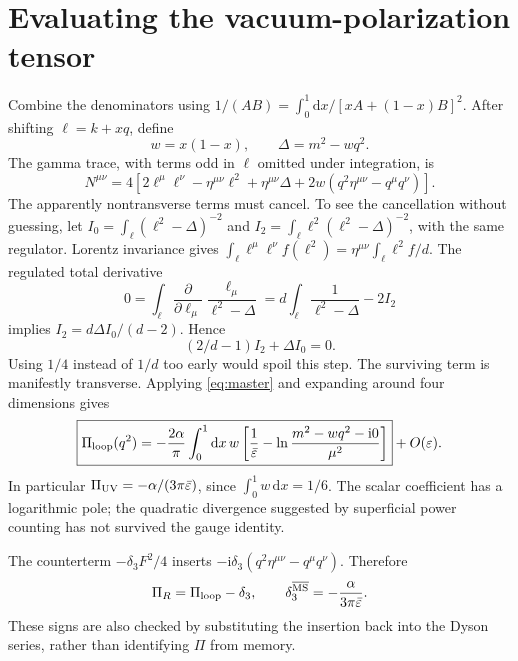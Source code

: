 \documentclass[11pt]{article}
\newcommand{\dd}{\mathrm d}
\newcommand{\ii}{\mathrm i}
\newcommand{\eps}{\varepsilon}
\newcommand{\MSbar}{\overline{\mathrm{MS}}}
\newcommand{\module}[1]{\clearpage\section{#1}}
\begin{document}
\module{Evaluating the vacuum-polarization tensor}
Combine the denominators using \(1/(AB)=\int_0^1\dd x/[xA+(1-x)B]^2\).
After shifting \(\ell=k+xq\), define
\begin{equation}
 w=x(1-x),\qquad \Delta=m^2-wq^2.
\end{equation}
The gamma trace, with terms odd in \(\ell\) omitted under integration,
is
\begin{equation}
 N^{\mu\nu}=4\left[
 2\ell^\mu\ell^\nu-\eta^{\mu\nu}\ell^2+\eta^{\mu\nu}\Delta
 +2w(q^2\eta^{\mu\nu}-q^\mu q^\nu)\right].
\end{equation}
The apparently nontransverse terms must cancel. To see the cancellation
without guessing, let
\(I_0=\int_\ell(\ell^2-\Delta)^{-2}\) and
\(I_2=\int_\ell\ell^2(\ell^2-\Delta)^{-2}\), with the same regulator.
Lorentz invariance gives
\(\int_\ell\ell^\mu\ell^\nu f(\ell^2)=\eta^{\mu\nu}\int_\ell\ell^2f/d\).
The regulated total derivative
\begin{equation}
 0=\int_\ell\frac{\partial}{\partial\ell_\mu}
 \frac{\ell_\mu}{\ell^2-\Delta}
 =d\int_\ell\frac1{\ell^2-\Delta}-2I_2
\end{equation}
implies \(I_2=d\Delta I_0/(d-2)\). Hence
\begin{equation}
 (2/d-1)I_2+\Delta I_0=0.
\end{equation}
Using \(1/4\) instead of \(1/d\) too early would spoil this step.
The surviving term is manifestly transverse. Applying
\eqref{eq:master} and expanding around four dimensions gives
\begin{equation}
 \boxed{\displaystyle
 \Pi_{\rm loop}(q^2)=-\frac{2\alpha}{\pi}\int_0^1\dd x\,w
 \left[\frac1{\bar\eps}-\ln\frac{m^2-wq^2-\ii0}{\mu^2}\right]}
 +O(\eps).
 \label{eq:piloop}
\end{equation}
In particular \(\Pi_{\rm UV}=-\alpha/(3\pi\bar\eps)\), since
\(\int_0^1w\,\dd x=1/6\). The scalar coefficient has a logarithmic pole;
the quadratic divergence suggested by superficial power counting has
not survived the gauge identity.

The counterterm \(-\delta_3F^2/4\) inserts
\(-\ii\delta_3(q^2\eta^{\mu\nu}-q^\mu q^\nu)\). Therefore
\begin{equation}
 \Pi_R=\Pi_{\rm loop}-\delta_3,\qquad
 \delta_3^{\MSbar}=-\frac{\alpha}{3\pi\bar\eps}.
\end{equation}
These signs are also checked by substituting the insertion back into
the Dyson series, rather than identifying \(\Pi\) from memory.
\end{document}
